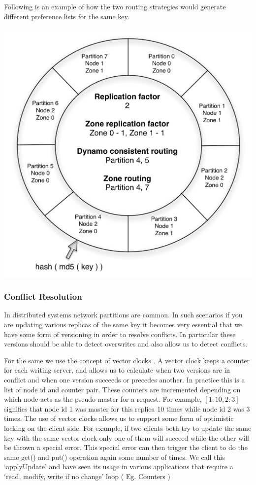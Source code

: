 \documentclass[10pt,twocolumn,preprint,natbib,authoryear]{sigplanconf}
\begin{document}
Following is an example of how the two routing strategies would generate different preference lists for the same key.  


\begin{center}
\includegraphics[scale=0.65]{hash.png}
\end{center}

\subsubsection {Conflict Resolution } 
In distributed systems network partitions are common. In such scenarios if you are updating various replicas of the same key it becomes very essential that we have some form of versioning in order to resolve conflicts. In particular these versions should be able to detect overwrites and also allow us to detect conflicts. 

For the same we use the concept of vector clocks \cite{Time, clocks, and the ordering of events in a distributed system}. A vector clock keeps a counter for each writing server, and allows us to calculate when two versions are in conflict and when one version succeeds or precedes another. In practice this is a list of node id and counter pair. These counters are incremented depending on which node acts as the pseudo-master for a request. For example,  $[1:10,2:3]$ signifies that node id 1 was master for this replica 10 times while node id 2 was 3 times. The use of vector clocks allows us to support some form of optimistic locking on the client side. For example, if two clients both try to update the same key with the same vector clock only one of them will succeed while the other will be thrown a special error. This special error can then trigger the client to do the same get() and put() operation again some number of times. We call this `applyUpdate' and have seen its usage in various applications that require a `read, modify, write if no change' loop ( Eg. Counters )
\end{document}
